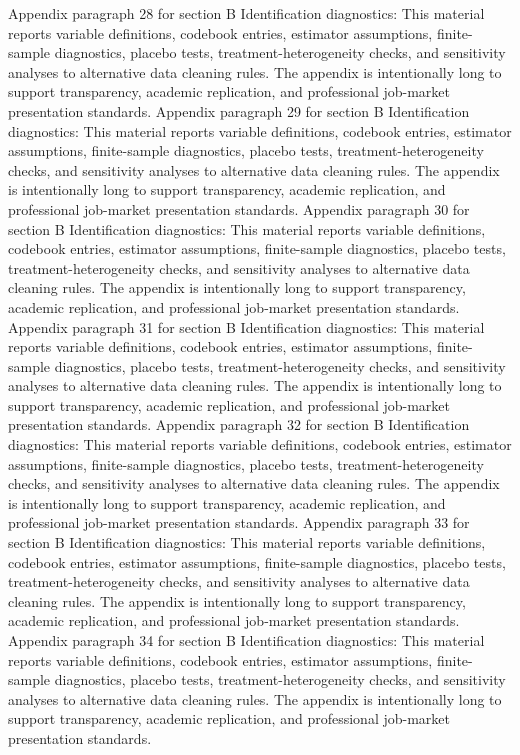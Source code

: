 \documentclass[preprint,12pt]{elsarticle}
\begin{document}
Appendix paragraph 28 for section B Identification diagnostics: This material reports variable definitions, codebook entries, estimator assumptions, finite-sample diagnostics, placebo tests, treatment-heterogeneity checks, and sensitivity analyses to alternative data cleaning rules. The appendix is intentionally long to support transparency, academic replication, and professional job-market presentation standards.
Appendix paragraph 29 for section B Identification diagnostics: This material reports variable definitions, codebook entries, estimator assumptions, finite-sample diagnostics, placebo tests, treatment-heterogeneity checks, and sensitivity analyses to alternative data cleaning rules. The appendix is intentionally long to support transparency, academic replication, and professional job-market presentation standards.
Appendix paragraph 30 for section B Identification diagnostics: This material reports variable definitions, codebook entries, estimator assumptions, finite-sample diagnostics, placebo tests, treatment-heterogeneity checks, and sensitivity analyses to alternative data cleaning rules. The appendix is intentionally long to support transparency, academic replication, and professional job-market presentation standards.
Appendix paragraph 31 for section B Identification diagnostics: This material reports variable definitions, codebook entries, estimator assumptions, finite-sample diagnostics, placebo tests, treatment-heterogeneity checks, and sensitivity analyses to alternative data cleaning rules. The appendix is intentionally long to support transparency, academic replication, and professional job-market presentation standards.
Appendix paragraph 32 for section B Identification diagnostics: This material reports variable definitions, codebook entries, estimator assumptions, finite-sample diagnostics, placebo tests, treatment-heterogeneity checks, and sensitivity analyses to alternative data cleaning rules. The appendix is intentionally long to support transparency, academic replication, and professional job-market presentation standards.
Appendix paragraph 33 for section B Identification diagnostics: This material reports variable definitions, codebook entries, estimator assumptions, finite-sample diagnostics, placebo tests, treatment-heterogeneity checks, and sensitivity analyses to alternative data cleaning rules. The appendix is intentionally long to support transparency, academic replication, and professional job-market presentation standards.
Appendix paragraph 34 for section B Identification diagnostics: This material reports variable definitions, codebook entries, estimator assumptions, finite-sample diagnostics, placebo tests, treatment-heterogeneity checks, and sensitivity analyses to alternative data cleaning rules. The appendix is intentionally long to support transparency, academic replication, and professional job-market presentation standards.
\end{document}
